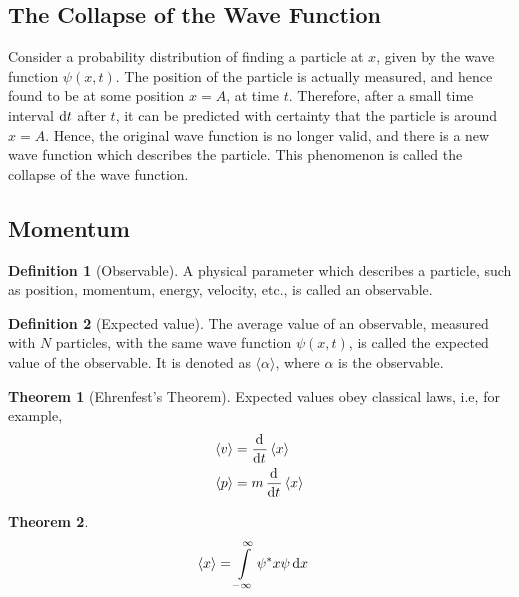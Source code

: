 \documentclass[titlepage, fleqn, a4paper, 12pt, twoside]{article}
\theoremstyle{definition}
\newtheorem{definition}{Definition}
\theoremstyle{theorem}
\newtheorem{theorem}{Theorem}
\let\Oldsubsection\subsection
\renewcommand{\subsection}{\FloatBarrier\Oldsubsection}
\begin{document}
\subsection{The Collapse of the Wave Function}

Consider a probability distribution of finding a particle at $x$, given by the wave function $\psi(x,t)$.
The position of the particle is actually measured, and hence found to be at some position $x = A$, at time $t$.
Therefore, after a small time interval $\dif t$ after $t$, it can be predicted with certainty that the particle is around $x = A$.
Hence, the original wave function is no longer valid, and there is a new wave function which describes the particle.
This phenomenon is called the collapse of the wave function.

\subsection{Momentum}

\begin{definition}[Observable]
	A physical parameter which describes a particle, such as position, momentum, energy, velocity, etc., is called an observable.
\end{definition}

\begin{definition}[Expected value]
	The average value of an observable, measured with $N$ particles, with the same wave function $\psi(x,t)$, is called the expected value of the observable.
	It is denoted as $\langle \alpha \rangle$, where $\alpha$ is the observable.
\end{definition}

\begin{theorem}[Ehrenfest's Theorem]
	Expected values obey classical laws, i.e, for example,
	\begin{align*}
		\langle v \rangle & = \dod{}{t} \langle x \rangle   \\
		\langle p \rangle & = m \dod{}{t} \langle x \rangle \\
	\end{align*}
	\label{Ehrenfest's_Theorem}
\end{theorem}

\begin{theorem}
	\begin{align*}
		\langle x \rangle & = \int\limits_{-\infty}^{\infty} \psi^* x \psi \dif x
	\end{align*}
\end{theorem}
\end{document}
